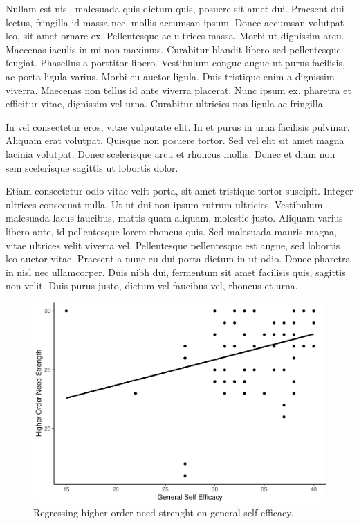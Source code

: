 \documentclass[english,,man]{apa6}
\begin{document}
Nullam est nisl, malesuada quis dictum quis, posuere sit amet dui. Praesent dui lectus, fringilla id massa nec, mollis accumsan ipsum. Donec accumsan volutpat leo, sit amet ornare ex. Pellentesque ac ultrices massa. Morbi ut dignissim arcu. Maecenas iaculis in mi non maximus. Curabitur blandit libero sed pellentesque feugiat. Phasellus a porttitor libero. Vestibulum congue augue ut purus facilisis, ac porta ligula varius. Morbi eu auctor ligula. Duis tristique enim a dignissim viverra. Maecenas non tellus id ante viverra placerat. Nunc ipsum ex, pharetra et efficitur vitae, dignissim vel urna. Curabitur ultricies non ligula ac fringilla.

In vel consectetur eros, vitae vulputate elit. In et purus in urna facilisis pulvinar. Aliquam erat volutpat. Quisque non posuere tortor. Sed vel elit sit amet magna lacinia volutpat. Donec scelerisque arcu et rhoncus mollis. Donec et diam non sem scelerisque sagittis ut lobortis dolor.

Etiam consectetur odio vitae velit porta, sit amet tristique tortor suscipit. Integer ultrices consequat nulla. Ut ut dui non ipsum rutrum ultricies. Vestibulum malesuada lacus faucibus, mattis quam aliquam, molestie justo. Aliquam varius libero ante, id pellentesque lorem rhoncus quis. Sed malesuada mauris magna, vitae ultrices velit viverra vel. Pellentesque pellentesque est augue, sed lobortis leo auctor vitae. Praesent a nunc eu dui porta dictum in ut odio. Donec pharetra in nisl nec ullamcorper. Duis nibh dui, fermentum sit amet facilisis quis, sagittis non velit. Duis purus justo, dictum vel faucibus vel, rhoncus et urna.

\begin{figure}
\centering
\includegraphics{figures/unnamed-chunk-5-1.pdf}
\caption{\label{fig:unnamed-chunk-5}Regressing higher order need strenght on general self efficacy.}
\end{figure}
\end{document}

